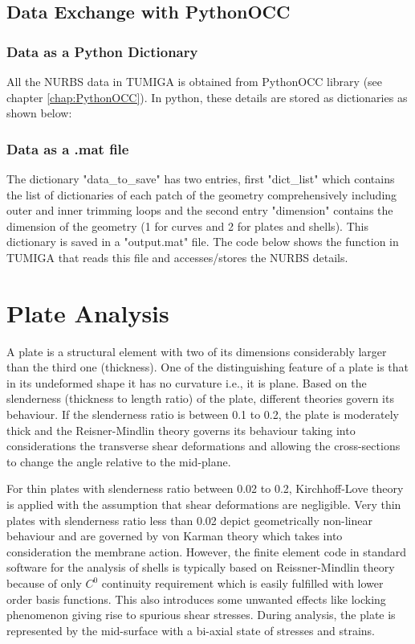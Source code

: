 \documentclass[12pt, a4paper]{report}
\begin{document}
\section{Data Exchange with PythonOCC}
\subsection{Data as a Python Dictionary }

All the NURBS data in TUMIGA is obtained from PythonOCC library (see chapter \ref{chap:PythonOCC}). In python, these details are stored as dictionaries as shown below:

\subsection{Data as a .mat file }

The dictionary "data\_to\_save" has two entries, first "dict\_list" which contains the list of dictionaries of each patch of the geometry comprehensively including outer and inner trimming loops and the second entry "dimension" contains the dimension of the geometry (1 for curves and 2 for plates and shells). This dictionary is saved in a "output.mat" file. The code below shows the function in TUMIGA that reads this file and accesses/stores the NURBS details.



\chapter{Plate Analysis} \label{chap: Plate}
A plate is a structural element with two of its dimensions considerably larger than the third one (thickness). One of the  distinguishing feature of a plate is that in its undeformed shape it has no curvature i.e., it is plane. Based on the slenderness (thickness to length ratio) of the plate, different theories govern its behaviour. If the slenderness ratio is between 0.1 to 0.2, the plate is moderately thick and the Reisner-Mindlin theory governs its behaviour taking into considerations the transverse shear deformations and allowing the cross-sections to change the angle relative to the mid-plane.
\par For thin plates with slenderness ratio between 0.02 to 0.2, Kirchhoff-Love theory is applied with the assumption that shear deformations are negligible. Very thin plates with slenderness ratio less than 0.02 depict geometrically non-linear behaviour and are governed by von Karman theory which takes into consideration the membrane action. However, the finite element code in standard software for the analysis of shells is typically based on Reissner-Mindlin theory because of only $C^0$ continuity requirement which is easily fulfilled with lower order basis functions. This also introduces some unwanted effects like locking phenomenon giving rise to spurious shear stresses. 
During analysis, the plate is represented by the mid-surface with a bi-axial state of stresses and strains.
\end{document}
